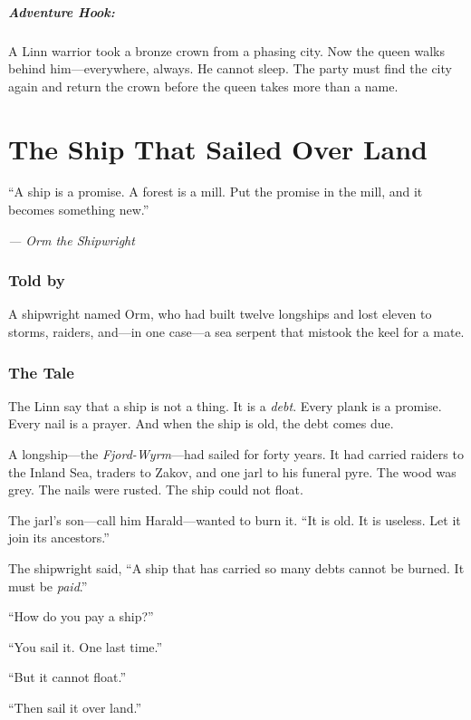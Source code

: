 \documentclass[9pt,a5paper]{extbook}
\begin{document}
\paragraph{Adventure Hook:}
A Linn warrior took a bronze crown from a phasing city. Now the queen walks behind him---everywhere, always. He cannot sleep. The party must find the city again and return the crown before the queen takes more than a name.

\clearpage

\chapter{The Ship That Sailed Over Land}

\epigraph{``A ship is a promise. A forest is a mill. Put the promise in the mill, and it becomes something new.''}{\textit{--- Orm the Shipwright}}

\subsection*{Told by}

A shipwright named Orm, who had built twelve longships and lost eleven to storms, raiders, and---in one case---a sea serpent that mistook the keel for a mate.

\subsection*{The Tale}

The Linn say that a ship is not a thing. It is a \textit{debt}. Every plank is a promise. Every nail is a prayer. And when the ship is old, the debt comes due.

A longship---the \textit{Fjord-Wyrm}---had sailed for forty years. It had carried raiders to the Inland Sea, traders to Zakov, and one jarl to his funeral pyre. The wood was grey. The nails were rusted. The ship could not float.

The jarl's son---call him Harald---wanted to burn it. ``It is old. It is useless. Let it join its ancestors.''

The shipwright said, ``A ship that has carried so many debts cannot be burned. It must be \textit{paid}.''

``How do you pay a ship?''

``You sail it. One last time.''

``But it cannot float.''

``Then sail it over land.''
\end{document}
